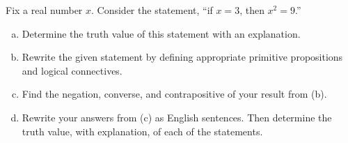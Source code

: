 \documentclass[11pt,letterpaper]{article}
\begin{document}
\newpage



 Fix a real number $x$. Consider the statement, ``if $x= 3$, then $x^2= 9$.''
	\begin{enumerate}[(a)]
	\item Determine the truth value of this statement with an explanation. 
	\item Rewrite the given statement by defining appropriate primitive propositions and logical connectives. 
	\item Find the negation, converse, and contrapositive of your result from (b).
	\item Rewrite your answers from (c) as English sentences. Then determine the truth value, with explanation, of each of the statements. 
	\end{enumerate}
\end{document}
